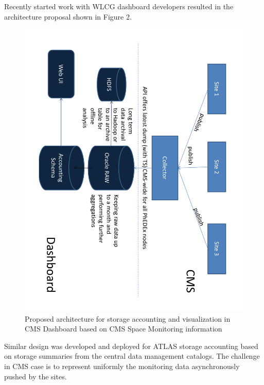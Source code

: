 Recently started work with WLCG dashboard developers resulted in the architecture 
proposal shown in Figure 2.
\begin{figure}[h]
\center
\includegraphics[width=0.8\linewidth, angle =90]
 {pictures/SpaceMonVisProposal-p1.pdf}    
\caption{Proposed architecture for storage accounting and visualization 
in CMS Dashboard based on CMS Space Monitoring information}
\label{fig:vis_proposal}
\end{figure}

Similar design was developed and deployed for ATLAS storage accounting \cite{DDMAccounting}
based on storage summaries from the central data management catalogs. The challenge in CMS 
case is to represent uniformly the monitoring data asynchronously pushed by the sites.
